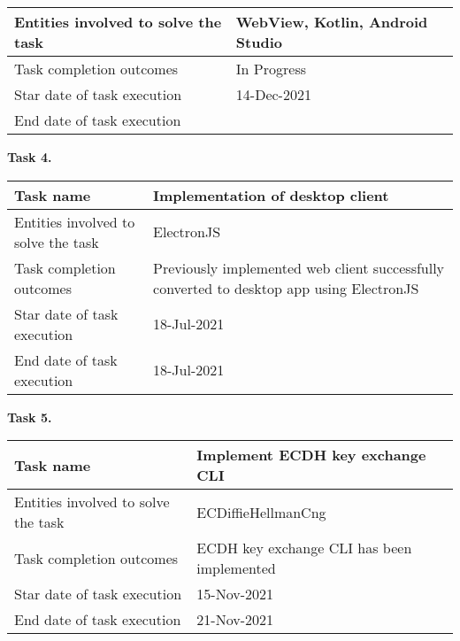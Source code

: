\begin{description}
\begin{tabular}{|p{}|p{}|}
        \hline
        Entities involved to solve the task & WebView, Kotlin, Android Studio     \\
        \hline
        Task completion outcomes            & In Progress                         \\
        \hline
        Star date of task execution         & 14-Dec-2021                         \\
        \hline
        End date of task execution          &                                     \\
        \hline
    \end{tabular}
    \item \hspace*{8mm}\textbf{Task 4.}\\
    \begin{tabular}{|p{}|p{}|}
        \hline
        Task name                           & Implementation of desktop client \\
        \hline
        Entities involved to solve the task & ElectronJS                       \\
        \hline
        Task completion outcomes & Previously implemented web client successfully converted to
        desktop app using ElectronJS \\
        \hline
        Star date of task execution         & 18-Jul-2021                      \\
        \hline
        End date of task execution          & 18-Jul-2021                      \\
        \hline
    \end{tabular}
    \item \hspace*{8mm}\textbf{Task 5.}\\
    \begin{tabular}{|p{}|p{}|}
        \hline
        Task name                           & Implement ECDH key exchange CLI            \\
        \hline
        Entities involved to solve the task & ECDiffieHellmanCng                         \\
        \hline
        Task completion outcomes            & ECDH key exchange CLI has been implemented \\
        \hline
        Star date of task execution         & 15-Nov-2021                                \\
        \hline
        End date of task execution          & 21-Nov-2021                                \\
        \hline
    \end{tabular}
\end{description}